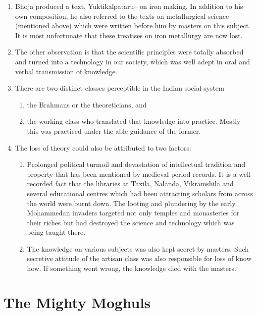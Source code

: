 \begin{enumerate}
\item Bhoja produced a text, Yuktikalpataru– on iron making. In addition to his own composition, he also referred to the texts on metallurgical science (mentioned above) which were written before him by masters on this subject. It is most unfortunate that these treatises on iron metallurgy are now lost.
\item The other observation is that the scientific principles were totally absorbed and turned into a technology in our society, which was well adept in oral and verbal transmission of knowledge.
\item There are two distinct classes perceptible in the Indian social system 
\begin{enumerate}
\item the Brahmans or the theoreticians, and 
\item the working class who translated that knowledge into practice. Mostly this was practiced under the able guidance of the former.
\end{enumerate}
\item The loss of theory could also be attributed to two factors:
\begin{enumerate}
\item Prolonged political turmoil and devastation of intellectual tradition and property that has been mentioned by medieval period records. It is a well recorded fact that the libraries at Taxila, Nalanda, Vikramshila and several educational centres which had been attracting scholars from across the world were burnt down. The looting and plundering by the early Mohammedan invaders targeted not only temples and monasteries for their riches but had destroyed the science and technology which was being taught there.
\item The knowledge on various subjects was also kept secret by masters. Such secretive attitude of the artisan class was also responsible for loss of know how. If something went wrong, the knowledge died with the masters. 
\end{enumerate}
\end{enumerate}

\section*{The Mighty Moghuls}\label{chapter5-section-2}

